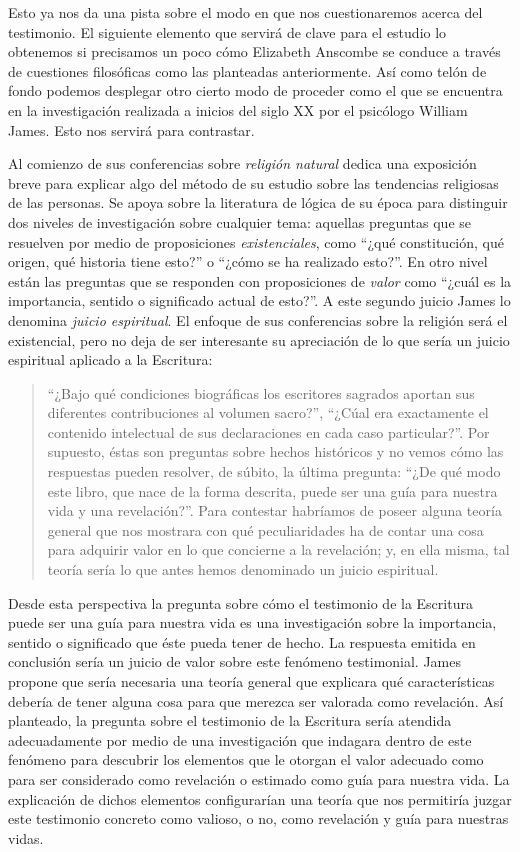 Esto ya nos da una pista sobre el modo en que nos cuestionaremos acerca del
testimonio. El siguiente elemento que servirá de clave para el estudio lo
obtenemos si precisamos un poco cómo Elizabeth Anscombe se conduce a través de
cuestiones filosóficas como las planteadas anteriormente. Así como telón de
fondo podemos desplegar otro cierto modo de proceder como el que se encuentra en
la investigación realizada a inicios del siglo XX por el psicólogo William
James. Esto nos servirá para contrastar.

Al comienzo de sus conferencias sobre \emph{religión natural} dedica una
exposición breve para explicar algo del método de su estudio sobre las
tendencias religiosas de las personas. Se apoya sobre la literatura de lógica de
su época para distinguir dos niveles de investigación sobre cualquier tema:
aquellas preguntas que se resuelven por medio de proposiciones
\emph{existenciales}, como \enquote{¿qué constitución, qué origen, qué historia
  tiene esto?} o \enquote{¿cómo se ha realizado esto?}. En otro nivel están las
preguntas que se responden con proposiciones de \emph{valor} como \enquote{¿cuál
  es la importancia, sentido o significado actual de esto?}. A este segundo
juicio James lo denomina \emph{juicio espiritual}. El enfoque de sus
conferencias sobre la religión será el existencial, pero no deja de ser
interesante su apreciación de lo que sería un juicio espiritual aplicado a la
Escritura:

\blockquote[{\cite[27]{james2002variedades}}]{\enquote{¿Bajo qué condiciones
    biográficas los escritores sagrados aportan sus diferentes contribuciones al
    volumen sacro?}, \enquote{¿Cúal era exactamente el contenido intelectual de
    sus declaraciones en cada caso particular?}. Por supuesto, éstas son
  preguntas sobre hechos históricos y no vemos cómo las respuestas pueden
  resolver, de súbito, la última pregunta: \enquote{¿De qué modo este libro, que
    nace de la forma descrita, puede ser una guía para nuestra vida y una
    revelación?}. Para contestar habríamos de poseer alguna teoría general que
  nos mostrara con qué peculiaridades ha de contar una cosa para adquirir valor
  en lo que concierne a la revelación; y, en ella misma, tal teoría sería lo que
  antes hemos denominado un juicio espiritual.}

Desde esta perspectiva la pregunta sobre cómo el testimonio de la Escritura
puede ser una guía para nuestra vida es una investigación sobre la importancia,
sentido o significado que éste pueda tener de hecho. La respuesta emitida en
conclusión sería un juicio de valor sobre este fenómeno testimonial. James
propone que sería necesaria una teoría general que explicara qué características
debería de tener alguna cosa para que merezca ser valorada como revelación. Así
planteado, la pregunta sobre el testimonio de la Escritura sería atendida
adecuadamente por medio de una investigación que indagara dentro de este
fenómeno para descubrir los elementos que le otorgan el valor adecuado como para
ser considerado como revelación o estimado como guía para nuestra vida. La
explicación de dichos elementos configurarían una teoría que nos permitiría
juzgar este testimonio concreto como valioso, o no, como revelación y guía para
nuestras vidas.

